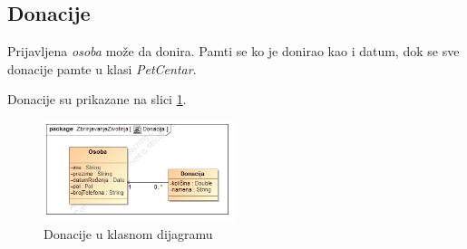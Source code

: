 \subsection{Donacije}
\par Prijavljena \textit{osoba} može da donira. Pamti se ko je donirao kao i datum, dok se sve donacije pamte u klasi \textit{PetCentar}.
\par Donacije su prikazane na slici \ref{fig:donations}.
\begin{figure}[h]
    \centering
    \includegraphics[width=0.5\textwidth, height=0.4\textwidth]{img/donation.jpg}
    \caption{Donacije u klasnom dijagramu}
    \label{fig:donations}
\end{figure}
